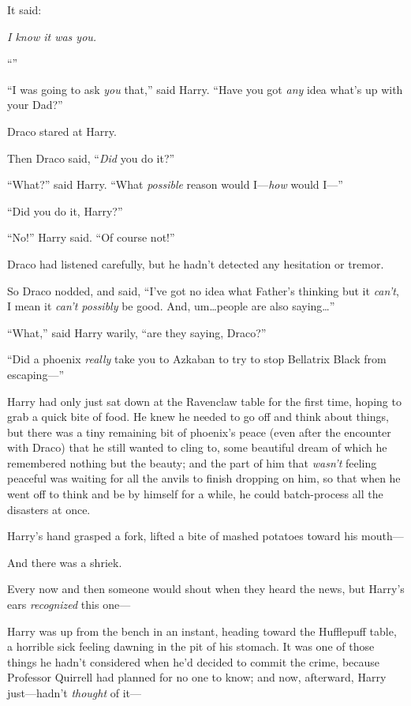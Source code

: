 It said:

\emph{I know it was you.}

“\emph{}”

“I was going to ask \emph{you} that,” said Harry. “Have you got \emph{any} idea what’s up with your Dad?”

Draco stared at Harry.

Then Draco said, “\emph{Did} you do it?”

“What?” said Harry. “What \emph{possible} reason would I—\emph{how} would I—”

“Did you do it, Harry?”

“No!” Harry said. “Of course not!”

Draco had listened carefully, but he hadn’t detected any hesitation or tremor.

So Draco nodded, and said, “I’ve got no idea what Father’s thinking but it \emph{can’t}, I mean it \emph{can’t possibly} be good. And, um…people are also saying…”

“What,” said Harry warily, “are they saying, Draco?”

“Did a phoenix \emph{really} take you to Azkaban to try to stop Bellatrix Black from escaping—”


Harry had only just sat down at the Ravenclaw table for the first time, hoping to grab a quick bite of food. He knew he needed to go off and think about things, but there was a tiny remaining bit of phoenix’s peace (even after the encounter with Draco) that he still wanted to cling to, some beautiful dream of which he remembered nothing but the beauty; and the part of him that \emph{wasn’t} feeling peaceful was waiting for all the anvils to finish dropping on him, so that when he went off to think and be by himself for a while, he could batch-process all the disasters at once.

Harry’s hand grasped a fork, lifted a bite of mashed potatoes toward his mouth—

And there was a shriek.

Every now and then someone would shout when they heard the news, but Harry’s ears \emph{recognized} this one—

Harry was up from the bench in an instant, heading toward the Hufflepuff table, a horrible sick feeling dawning in the pit of his stomach. It was one of those things he hadn’t considered when he’d decided to commit the crime, because Professor Quirrell had planned for no one to know; and now, afterward, Harry just—hadn’t \emph{thought} of it—

